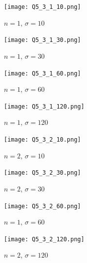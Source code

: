 \documentclass[
	12pt, %
]{style/fphw}
\begin{document}
\begin{figure}[H]
    \centering
        \begin{subfigure}[b]{.22\textwidth}
             \centering
             \texttt{[image: Q5\_3\_1\_10.png]}
             \caption{$n=1$, $\sigma=10$}
             \label{Q5_3_1_10}
         \end{subfigure}
         \hfill
         \begin{subfigure}[b]{.22\textwidth}
             \centering
             \texttt{[image: Q5\_3\_1\_30.png]}
             \caption{$n=1$, $\sigma=30$}
             \label{Q5_3_1_30}
         \end{subfigure}
         \hfill
         \begin{subfigure}[b]{.22\textwidth}
             \centering
             \texttt{[image: Q5\_3\_1\_60.png]}
             \caption{$n=1$, $\sigma=60$}
             \label{Q5_3_1_60.tif}
         \end{subfigure}
         \hfill
         \begin{subfigure}[b]{.22\textwidth}
             \centering
             \texttt{[image: Q5\_3\_1\_120.png]}
             \caption{$n=1$, $\sigma=120$}
             \label{Q5_3_1_120.tif}
         \end{subfigure}
     \vfill
         \begin{subfigure}[b]{.22\textwidth}
             \centering
             \texttt{[image: Q5\_3\_2\_10.png]}
             \caption{$n=2$, $\sigma=10$}
             \label{Q5_3_2_10}
         \end{subfigure}
         \hfill
         \begin{subfigure}[b]{.22\textwidth}
             \centering
             \texttt{[image: Q5\_3\_2\_30.png]}
             \caption{$n=2$, $\sigma=30$}
             \label{Q5_3_2_30}
         \end{subfigure}
         \hfill
         \begin{subfigure}[b]{.22\textwidth}
             \centering
             \texttt{[image: Q5\_3\_2\_60.png]}
             \caption{$n=1$, $\sigma=60$}
             \label{Q5_3_1_60}
         \end{subfigure}
         \hfill
         \begin{subfigure}[b]{.22\textwidth}
             \centering
             \texttt{[image: Q5\_3\_2\_120.png]}
             \caption{$n=2$, $\sigma=120$}
             \label{Q5_3_2_120}
         \end{subfigure}
     \vfill
         \begin{subfigure}[b]{.22\textwidth}

\end{subfigure}
\end{figure}
\end{document}

